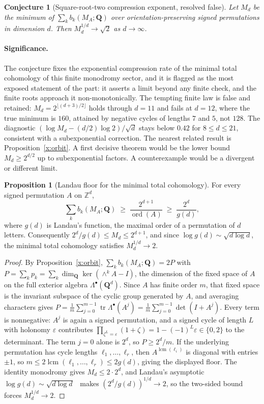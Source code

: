 \documentclass[11pt]{article}
\newtheorem{conjecture}{Conjecture}
\theoremstyle{definition}
\newcommand{\Z}{\mathbb Z}
\providecommand{\Z}{\mathbb Z}
\newtheorem{proposition}{Proposition}
\begin{document}
\begin{conjecture}[Square-root-two compression exponent, resolved false]\label{x19}
Let $M_d$ be the minimum of $\sum_kb_k(M_A;\mathbf Q)$ over orientation-preserving signed permutations in dimension $d$.  Then $M_d^{1/d}\to\sqrt2$ as $d\to\infty$.
\end{conjecture}

\paragraph{Significance.}
The conjecture fixes the exponential compression rate of the minimal total cohomology of this finite monodromy sector, and it is flagged as the most exposed statement of the part: it asserts a limit beyond any finite check, and the finite roots approach it non-monotonically.  The tempting finite law is false and retained: $M_d=2^{\lfloor(d+3)/2\rfloor}$ holds through $d=11$ and fails at $d=12$, where the true minimum is $160$, attained by negative cycles of lengths $7$ and $5$, not $128$.  The diagnostic $(\log M_d-(d/2)\log2)/\sqrt d$ stays below $0.42$ for $8\le d\le21$, consistent with a subexponential correction.  The nearest related result is Proposition~\ref{x:orbit}.  A first decisive theorem would be the lower bound $M_d\ge2^{d/2}$ up to subexponential factors.  A counterexample would be a divergent or different limit.

\begin{proposition}[Landau floor for the minimal total cohomology]\label{x:landau}
For every signed permutation $A$ on $\Z^d$,
\[
\sum_kb_k(M_A;\mathbf Q)\;\ge\;\frac{2^{d+1}}{\operatorname{ord}(A)}\;\ge\;\frac{2^{d}}{g(d)},
\]
where $g(d)$ is Landau's function, the maximal order of a permutation of $d$ letters.  Consequently $2^d/g(d)\le M_d\le2^{d+1}$, and since $\log g(d)\sim\sqrt{d\log d}$, the minimal total cohomology satisfies $M_d^{1/d}\to2$.
\end{proposition}

\begin{proof}
By Proposition~\ref{x:orbit}, $\sum_kb_k(M_A;\mathbf Q)=2P$ with $P=\sum_kp_k=\sum_k\dim_{\mathbf Q}\ker(\wedge^kA-I)$, the dimension of the fixed space of $A$ on the full exterior algebra $\Lambda^\bullet(\mathbf Q^d)$.  Since $A$ has finite order $m$, that fixed space is the invariant subspace of the cyclic group generated by $A$, and averaging characters gives $P=\frac1m\sum_{j=0}^{m-1}\operatorname{tr}\Lambda^\bullet(A^j)=\frac1m\sum_{j=0}^{m-1}\det(I+A^j)$.  Every term is nonnegative: $A^j$ is again a signed permutation, and a signed cycle of length $L$ with holonomy $\varepsilon$ contributes $\prod_{\zeta^L=\varepsilon}(1+\zeta)=1-(-1)^L\varepsilon\in\{0,2\}$ to the determinant.  The term $j=0$ alone is $2^d$, so $P\ge2^d/m$.  If the underlying permutation has cycle lengths $\ell_1,\ldots,\ell_r$, then $A^{\operatorname{lcm}(\ell_i)}$ is diagonal with entries $\pm1$, so $m\le2\operatorname{lcm}(\ell_1,\ldots,\ell_r)\le2g(d)$, giving the displayed floor.  The identity monodromy gives $M_d\le2\cdot2^d$, and Landau's asymptotic $\log g(d)\sim\sqrt{d\log d}$~\cite{Lan03} makes $(2^d/g(d))^{1/d}\to2$, so the two-sided bound forces $M_d^{1/d}\to2$.
\end{proof}
\end{document}
